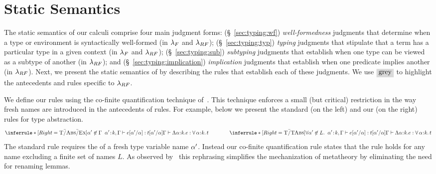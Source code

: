 \section{Static Semantics}
\label{sec:lang:static}

The static semantics of our calculi comprise
four main judgment forms:
%
(\S~\ref{sec:typing:wf}) {\emph{well-formedness}} judgments that determine when a type
or environment is syntactically well-formed (in $\lambda_{F}$ and $\lambda_{RF}$);
%
(\S~\ref{sec:typing:typ}) {\emph{typing}} judgments that stipulate that a term has
a particular type in a given context (in $\lambda_{F}$ and $\lambda_{RF}$);
%
(\S~\ref{sec:typing:sub}) {\emph{subtyping}} judgments that establish when one type can
be viewed as a subtype of another (in $\lambda_{RF}$); and
%
(\S~\ref{sec:typing:implication}) {\emph{implication}} judgments that establish when one predicate
implies another (in $\lambda_{RF}$).
%
Next, we present the static semantics of \sysrf by describing
the rules that establish 
each of these judgments.
%
We use $\greybox{\mbox{grey}}$ to highlight the antecedents and rules
specific to $\lambda_{RF}$.
%

\begin{fullversion}

%
We define our rules using the co-finite quantification technique
of~\citet{AydemirCPPW08}.
%
This technique enforces a small (but critical) restriction
in the way fresh names are introduced in the antecedents of rules.
%
For example, below we present the standard (on the left)
and our (on the right) rules for type abstraction.
$$
\inferrule*[Right=\tAbsEx]
    {\notmem{\al'}{\tcenv} \;\;
      \hastype{\bind{\al'}{\skind},\tcenv}{\subst{\sexpr}{\al}{\al'}}{\subst{\stype}{\al}{\al'}} }
    {\hastype{\tcenv}{\tabs{\al}{\skind}{\sexpr}}{\polytype{\al}{\skind}{\stype}}}
\qquad\qquad
\inferrule*[Right=\tTAbs]
    {\forall\notmem{\al'}{L}. \;\;
      \hastype{\bind{\al'}{\skind},\tcenv}{\subst{\sexpr}{\al}{\al'}}{\subst{\stype}{\al}{\al'}} }
    {\hastype{\tcenv}{\tabs{\al}{\skind}{\sexpr}}{\polytype{\al}{\skind}{\stype}}}
$$
%
The standard rule \tAbsEx requires the  of a
fresh type variable name $\alpha'$.
%
Instead our co-finite quantification rule
states that the rule holds for any name excluding
a finite set of names $L$. %
%
As observed by~\citet{AydemirCPPW08} this rephrasing
simplifies the mechanization of metatheory
by eliminating the need for renaming lemmas.

\end{fullversion}

